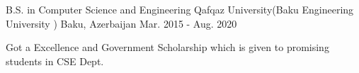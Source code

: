 

\begin{cventries}

  \cventry
    {B.S. in Computer Science and Engineering} %
    {Qafqaz University(Baku Engineering University )} %
    {Baku, Azerbaijan} %
    {Mar. 2015 - Aug. 2020} %
    {
      \begin{cvitems} %
        \item {Got a Excellence and Government Scholarship which is given to promising students in CSE Dept.}
      \end{cvitems}
    }

\end{cventries}
